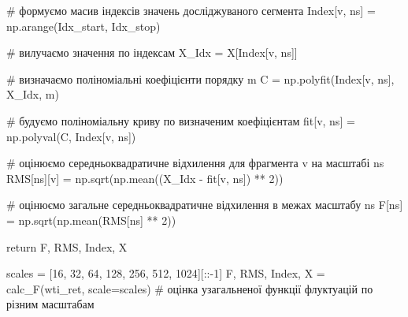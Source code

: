 \documentclass[
  letterpaper,
]{report}
\newenvironment{Shaded}{\begin{snugshade}}{\end{snugshade}}
\newcommand{\CommentTok}[1]{\textcolor[rgb]{0.37,0.37,0.37}{#1}}
\newcommand{\ControlFlowTok}[1]{\textcolor[rgb]{0.00,0.23,0.31}{#1}}
\newcommand{\DecValTok}[1]{\textcolor[rgb]{0.68,0.00,0.00}{#1}}
\newcommand{\NormalTok}[1]{\textcolor[rgb]{0.00,0.23,0.31}{#1}}
\newcommand{\OperatorTok}[1]{\textcolor[rgb]{0.37,0.37,0.37}{#1}}
\begin{document}
\begin{Shaded}
\begin{Highlighting}[]
            \CommentTok{\# формуємо масив індексів значень досліджуваного сегмента}
\NormalTok{            Index[v, ns] }\OperatorTok{=}\NormalTok{ np.arange(Idx\_start, Idx\_stop)  }

            \CommentTok{\# вилучаємо значення по індексам}
\NormalTok{            X\_Idx }\OperatorTok{=}\NormalTok{ X[Index[v, ns]]                       }

            \CommentTok{\# визначаємо поліноміальні коефіцієнти порядку m}
\NormalTok{            C }\OperatorTok{=}\NormalTok{ np.polyfit(Index[v, ns], X\_Idx, m) }
            
            \CommentTok{\# будуємо поліноміальну криву по визначеним коефіцієнтам}
\NormalTok{            fit[v, ns] }\OperatorTok{=}\NormalTok{ np.polyval(C, Index[v, ns])  }

            \CommentTok{\# оцінюємо середньоквадратичне відхилення для фрагмента v на масштабі ns }
\NormalTok{            RMS[ns][v] }\OperatorTok{=}\NormalTok{ np.sqrt(np.mean((X\_Idx }\OperatorTok{{-}}\NormalTok{ fit[v, ns]) }\OperatorTok{**} \DecValTok{2}\NormalTok{)) }

        \CommentTok{\# оцінюємо загальне середньоквадратичне відхилення в межах масштабу ns}
\NormalTok{        F[ns] }\OperatorTok{=}\NormalTok{ np.sqrt(np.mean(RMS[ns] }\OperatorTok{**} \DecValTok{2}\NormalTok{))}

    \ControlFlowTok{return}\NormalTok{ F, RMS, Index, X}
\end{Highlighting}
\end{Shaded}

\begin{Shaded}
\begin{Highlighting}[]
\NormalTok{scales }\OperatorTok{=}\NormalTok{ [}\DecValTok{16}\NormalTok{, }\DecValTok{32}\NormalTok{, }\DecValTok{64}\NormalTok{, }\DecValTok{128}\NormalTok{, }\DecValTok{256}\NormalTok{, }\DecValTok{512}\NormalTok{, }\DecValTok{1024}\NormalTok{][::}\OperatorTok{{-}}\DecValTok{1}\NormalTok{]}
\NormalTok{F, RMS, Index, X }\OperatorTok{=}\NormalTok{ calc\_F(wti\_ret, scale}\OperatorTok{=}\NormalTok{scales) }\CommentTok{\# оцінка узагальненої функції флуктуацій по різним масштабам}
\end{Highlighting}
\end{Shaded}
\end{document}
